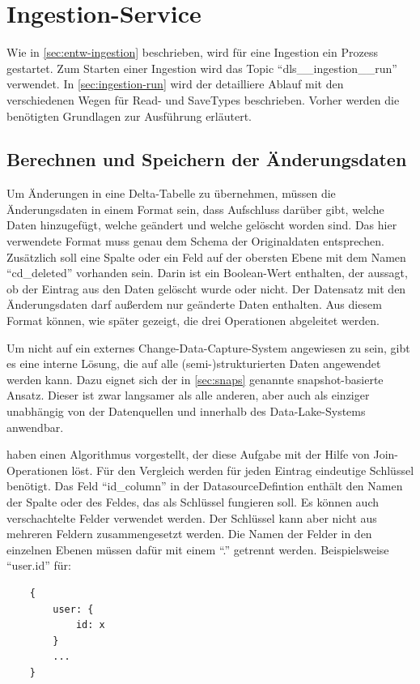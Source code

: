\section{Ingestion-Service}

Wie in \cref{sec:entw-ingestion} beschrieben, wird für eine Ingestion ein Prozess gestartet.
Zum Starten einer Ingestion wird das Topic "`dls\_\_ingestion\_\_run"' verwendet.
In \cref{sec:ingestion-run} wird der detailliere Ablauf mit den verschiedenen Wegen für Read- und SaveTypes beschrieben.
Vorher werden die benötigten Grundlagen zur Ausführung erläutert.

\subsection{Berechnen und Speichern der Änderungsdaten}
Um Änderungen in eine Delta-Tabelle zu übernehmen, müssen die Änderungsdaten in einem Format sein, dass Aufschluss darüber gibt, welche Daten hinzugefügt, welche geändert und welche gelöscht worden sind.
Das hier verwendete Format muss genau dem Schema der Originaldaten entsprechen.
Zusätzlich soll eine Spalte oder ein Feld auf der obersten Ebene mit dem Namen "`cd\_deleted"' vorhanden sein.
Darin ist ein Boolean-Wert enthalten, der aussagt, ob der Eintrag aus den Daten gelöscht wurde oder nicht.
Der Datensatz mit den Änderungsdaten darf außerdem nur geänderte Daten enthalten.
Aus diesem Format können, wie später gezeigt, die drei Operationen abgeleitet werden.

Um nicht auf ein externes Change-Data-Capture-System angewiesen zu sein, gibt es eine interne Lösung, die auf alle (semi-)strukturierten Daten angewendet werden kann.
Dazu eignet sich der in \cref{sec:snaps} genannte snapshot-basierte Ansatz.
Dieser ist zwar langsamer als alle anderen, aber auch als einziger unabhängig von der Datenquellen und innerhalb des Data-Lake-Systems anwendbar.

\textcite{snapshot_algos} haben einen Algorithmus vorgestellt, der diese Aufgabe mit der Hilfe von Join-Operationen löst.
Für den Vergleich werden für jeden Eintrag eindeutige Schlüssel benötigt.
Das Feld "`id\_column"' in der DatasourceDefintion enthält den Namen der Spalte oder des Feldes, das als Schlüssel fungieren soll.
Es können auch verschachtelte Felder verwendet werden.
Der Schlüssel kann aber nicht aus mehreren Feldern zusammengesetzt werden.
Die Namen der Felder in den einzelnen Ebenen müssen dafür mit einem "`."' getrennt werden.
Beispielsweise "`user.id"' für: \begin{verbatim}
    {
        user: { 
            id: x 
        }
        ...
    }
\end{verbatim}

